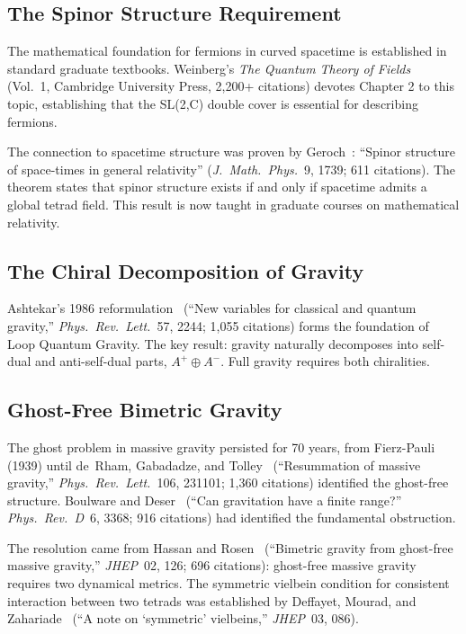 \documentclass[aps,prd,preprint,superscriptaddress,showpacs,preprintnumbers,amsmath,amssymb,nofootinbib]{revtex4-2}
\begin{document}
\subsection{The Spinor Structure Requirement}
\label{subsec:spinor-foundation}

The mathematical foundation for fermions in curved spacetime is established in standard graduate textbooks. Weinberg's \emph{The Quantum Theory of Fields}~\cite{weinberg1995} (Vol.\ 1, Cambridge University Press, 2,200+ citations) devotes Chapter 2 to this topic, establishing that the SL(2,C) double cover is essential for describing fermions.

The connection to spacetime structure was proven by Geroch~\cite{geroch1968}: ``Spinor structure of space-times in general relativity'' (\emph{J.\ Math.\ Phys.}\ 9, 1739; 611 citations). The theorem states that spinor structure exists if and only if spacetime admits a global tetrad field. This result is now taught in graduate courses on mathematical relativity.

\subsection{The Chiral Decomposition of Gravity}
\label{subsec:chiral-foundation}

Ashtekar's 1986 reformulation~\cite{ashtekar1986} (``New variables for classical and quantum gravity,'' \emph{Phys.\ Rev.\ Lett.}\ 57, 2244; 1,055 citations) forms the foundation of Loop Quantum Gravity. The key result: gravity naturally decomposes into self-dual and anti-self-dual parts, $A^+ \oplus A^-$. Full gravity requires both chiralities.

\subsection{Ghost-Free Bimetric Gravity}
\label{subsec:bimetric-foundation}

The ghost problem in massive gravity persisted for 70 years, from Fierz-Pauli (1939) until de~Rham, Gabadadze, and Tolley~\cite{drgt2011} (``Resummation of massive gravity,'' \emph{Phys.\ Rev.\ Lett.}\ 106, 231101; 1,360 citations) identified the ghost-free structure. Boulware and Deser~\cite{boulware1972} (``Can gravitation have a finite range?'' \emph{Phys.\ Rev.\ D}\ 6, 3368; 916 citations) had identified the fundamental obstruction.

The resolution came from Hassan and Rosen~\cite{hassan2012} (``Bimetric gravity from ghost-free massive gravity,'' \emph{JHEP}\ 02, 126; 696 citations): ghost-free massive gravity requires two dynamical metrics. The symmetric vielbein condition for consistent interaction between two tetrads was established by Deffayet, Mourad, and Zahariade~\cite{deffayet2013} (``A note on `symmetric' vielbeins,'' \emph{JHEP}\ 03, 086).
\end{document}
